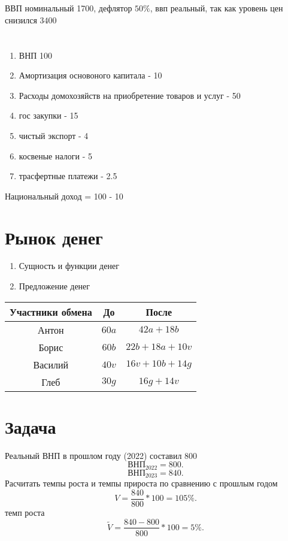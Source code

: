 \documentclass[14pt]{extarticle}
\begin{document}
\section{}
ВВП номинальный 1700, дефлятор  $50\%$, ввп реальный, так как уровень цен снизился $3400$

\section{}
\begin{enumerate}
    \item ВНП 100
    \item Амортизация основоного капитала - 10
    \item Расходы домохозяйств на приобретение товаров и услуг - 50
    \item гос закупки - 15
    \item чистый экспорт - 4
    \item косвеные налоги - 5
    \item трасфертные платежи - 2.5
\end{enumerate}
Национальный доход = 100 - 10
\section{Рынок денег}
\begin{enumerate}
    \item Сущность и функции денег
    \item Предложение денег
\end{enumerate}
\begin{tabular}{|c|c|c|}
    \hline
    Участники обмена & До & После\\
    \hline
    Антон &  $60a$ & $42a + 18b$\\
    \hline
    Борис &   $60 b$ &  $22b + 18a + 10 v$\\
    \hline
    Василий &  $40v$ &  $16v + 10b + 14g$\\
    \hline
    Глеб &  $30g$ & $16g + 14v$ \\
    \hline
\end{tabular}
\section{Задача}
Реальный ВНП в прошлом году (2022) составил 800
\[
    \text{ВНП}_{2022} = 800
.\] 
\[
    \text{ВНП}_{2023} = 840
.\] 
Расчитать темпы роста и темпы прироста по сравнению с прошлым годом
\[
V = \frac{840}{800} * 100 = 105 \%
.\] 
темп роста
\[
    \tilde{V} = \frac{840 - 800}{800} * 100 = 5 \%
.\] 
\end{document}

